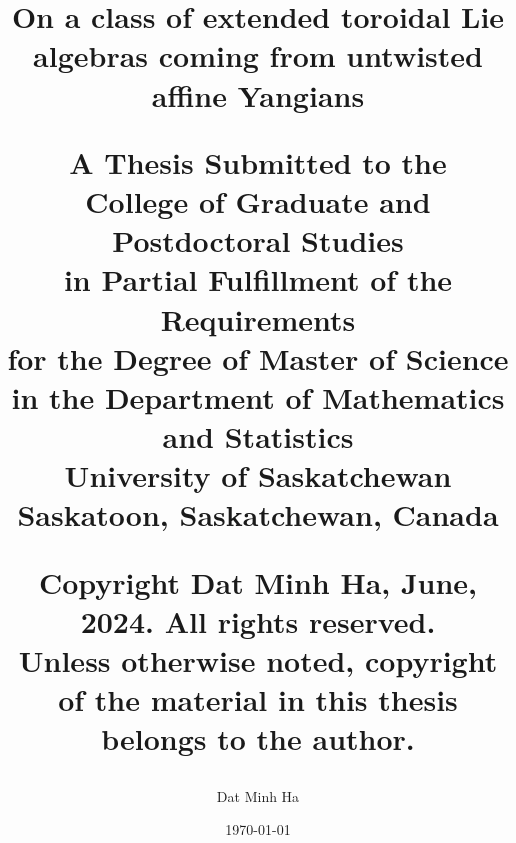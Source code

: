 \title{
    \texorpdfstring{\Huge On a class of extended toroidal Lie algebras coming from untwisted affine Yangians}

    \vfill

    \begin{centering}
        \normalsize A Thesis Submitted to the
        \\
        College of Graduate and Postdoctoral Studies
        \\
        in Partial Fulfillment of the Requirements
        \\
        for the Degree of Master of Science
        \\
        in the Department of Mathematics and Statistics
        \\
        University of Saskatchewan
        \\
        Saskatoon, Saskatchewan, Canada
    \end{centering}

    \vfill

    \begin{centering}
        \normalsize \textcopyright Copyright Dat Minh Ha, June, 2024. All rights reserved.
        \\
        Unless otherwise noted, copyright of the material in this thesis belongs to the author.
    \end{centering}

    \vfill

    \author{\normalsize Dat Minh Ha}
    \date{\normalsize \today}
}

\maketitle